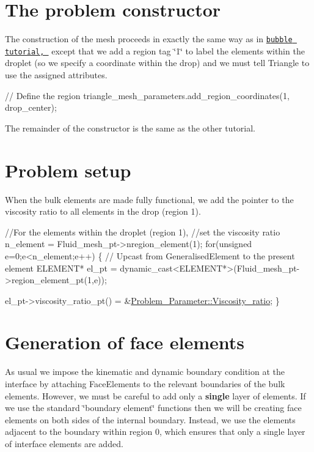 \hypertarget{index_constructor}{}\section{The problem constructor}\label{index_constructor}
The construction of the mesh proceeds in exactly the same way as in \href{../../adaptive_bubble_in_channel/html/index.html}{\tt bubble tutorial, } except that we add a region tag \char`\"{}1\char`\"{} to label the elements within the droplet (so we specify a coordinate within the drop) and we must tell {\ttfamily Triangle} to use the assigned attributes.  
\begin{DoxyCodeInclude}
 \textcolor{comment}{// Define the region}
 triangle\_mesh\_parameters.add\_region\_coordinates(1, drop\_center);

\end{DoxyCodeInclude}
 The remainder of the constructor is the same as the other tutorial.



 

\hypertarget{index_problem_setup}{}\section{Problem setup}\label{index_problem_setup}
When the bulk elements are made fully functional, we add the pointer to the viscosity ratio to all elements in the drop (region 1).


\begin{DoxyCodeInclude}
   \textcolor{comment}{//For the elements within the droplet (region 1),}
   \textcolor{comment}{//set the viscosity ratio}
   n\_element = Fluid\_mesh\_pt->nregion\_element(1);
   \textcolor{keywordflow}{for}(\textcolor{keywordtype}{unsigned} e=0;e<n\_element;e++)
    \{
     \textcolor{comment}{// Upcast from GeneralisedElement to the present element}
     ELEMENT* el\_pt = 
      \textcolor{keyword}{dynamic\_cast<}ELEMENT*\textcolor{keyword}{>}(Fluid\_mesh\_pt->region\_element\_pt(1,e));
     
     el\_pt->viscosity\_ratio\_pt() = &\hyperlink{namespaceProblem__Parameter_afdb95f68bd3c77e4c12001a29bd26e31}{Problem\_Parameter::Viscosity\_ratio};
    \}

\end{DoxyCodeInclude}




 

\hypertarget{index_face_elements}{}\section{Generation of face elements}\label{index_face_elements}
As usual we impose the kinematic and dynamic boundary condition at the interface by attaching {\ttfamily Face\+Elements} to the relevant boundaries of the bulk elements. However, we must be careful to add only a {\bfseries single} layer of elements. If we use the standard \char`\"{}boundary element\char`\"{} functions then we will be creating face elements on both sides of the internal boundary. Instead, we use the elements adjacent to the boundary within region 0, which ensures that only a single layer of interface elements are added.

